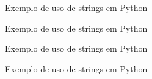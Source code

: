 \begin{frame}[fragile]{Exemplo de uso de strings em Python}
\end{frame}

\begin{frame}[fragile]{Exemplo de uso de strings em Python}
\end{frame}

\begin{frame}[fragile]{Exemplo de uso de strings em Python}
\end{frame}

\begin{frame}[fragile]{Exemplo de uso de strings em Python}
\end{frame}
